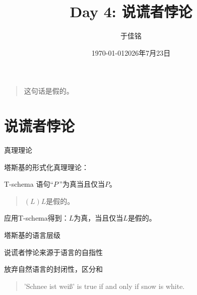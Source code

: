 \documentclass{zhslides}
\title{Day 4: 说谎者悖论}
\date{\today}
\date{2026年7月23日}
\author{于佳铭}
\institute{唯理书院2026\\精确的逻辑与模糊的意义}
\begin{document}
\maketitle





\begin{frame}
  
  \begin{quote}
    这句话是假的。
  \end{quote}
  
\end{frame}



\section{说谎者悖论}

\begin{frame}{真理理论}
  
  塔斯基的形式化真理理论：
  
  \begin{law*}{T-schema}
    语句{``$P$\,\textquotedblright}为真当且仅当$P$。
  \end{law*}
  \vspace{4ex}
  \pause
  
  \begin{quote}
    $(L)$\quad $L$是假的。
  \end{quote}
  \pause
  应用T-schema得到：$L$为真，当且仅当$L$是假的。\contradiction
  
\end{frame}


\begin{frame}{塔斯基的语言层级}
  
  \bit
    \item 说谎者悖论来源于语言的自指性
    \item 放弃自然语言的封闭性，区分和
  \eit
  \vspace{4ex}
  \pause
  
  \begin{quote}
    'Schnee ist wei\ss' is true if and only if snow is white.
  \end{quote}
  
\end{frame}
\end{document}
